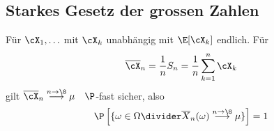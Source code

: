 \subsection{Starkes Gesetz der grossen Zahlen}
 Für $\cX_1, \ldots$ mit $\cX_k$ unabhängig mit $\E[\cX_k]$ endlich. Für
\[
    \overline{\cX}_n = \frac{1}{n} S_n = \frac{1}{n} \sum_{k = 1}^{n} \cX_k 
\]
gilt $\overline{\cX}_n \overset{n \rightarrow \8}{\longrightarrow} \mu \quad \P$-fast sicher, also
\[
    \P\left[ \{ \omega \in \Omega \divider \overline{X}_n(\omega) \overset{n \rightarrow \8}{\longrightarrow} \mu \} \right] = 1
\]
